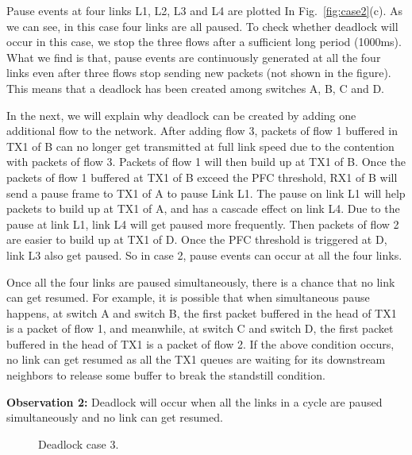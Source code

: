 Pause events at four links L1, L2, L3 and L4 are plotted In Fig.~\ref{fig:case2}(c). As we can see, in this case four links are all paused. To check whether deadlock will occur in this case, we stop the three flows after a sufficient long period (1000ms). What we find is that, pause events are continuously generated at all the four links even after three flows stop sending new packets (not shown in the figure). This means that a deadlock has been created among switches A, B, C and D.

In the next, we will explain why deadlock can be created by adding one additional flow to the network. After adding flow 3, packets of flow 1 buffered in TX1 of B can no longer get transmitted at full link speed due to the contention with packets of flow 3. Packets of flow 1 will then build up at TX1 of B. Once the packets of flow 1 buffered at TX1 of B exceed the PFC threshold, RX1 of B will send a pause frame to TX1 of A to pause Link L1. The pause on link L1 will help packets to build up at TX1 of A, and has a cascade effect on link L4. Due to the pause at link L1, link L4 will get paused more frequently. Then packets of flow 2 are easier to build up at TX1 of D. Once the PFC threshold is triggered at D, link L3 also get paused. So in case 2, pause events can occur at all the four links.

Once all the four links are paused simultaneously, there is a chance that no link can get resumed. For example, it is possible that when simultaneous pause happens, at switch A and switch B, the first packet buffered in the head of TX1 is a packet of flow 1, and meanwhile, at switch C and switch D, the first packet buffered in the head of TX1 is a packet of flow 2. If the above condition occurs, no link can get resumed as all the TX1 queues are waiting for its downstream neighbors to release some buffer to break the standstill condition.

\textbf{Observation 2:} Deadlock will occur when all the links in a cycle are paused simultaneously and no link can get resumed.


\begin{figure}[t]
\centering



\caption{Deadlock case 3.}\label{fig:case3}

\end{figure}

